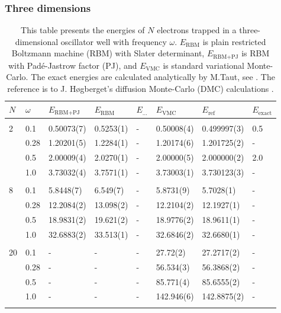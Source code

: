 \subsubsection{Three dimensions}
\begin{table} [H]
	\caption{This table presents the energies of $N$ electrons trapped in a three-dimensional oscillator well with frequency $\omega$. $E_{\text{RBM}}$ is plain restricted Boltzmann machine (RBM) with Slater determinant, $E_{\text{RBM+PJ}}$ is RBM with Padé-Jastrow factor (PJ), and $E_{\text{VMC}}$ is standard variational Monte-Carlo. The exact energies are calculated analytically by M.Taut, see \cite{taut_two_1993}. The reference is to J. Høgberget's diffusion Monte-Carlo (DMC) calculations \cite{hogberget_quantum_2013}. } 
	\begin{tabularx}{\textwidth}{l:l|XXXXXX} \hline\hline
		\label{tab:quantumdotswinteraction3D}
		$N$ & $\omega$ & $E_{\text{RBM+PJ}}$ & $E_{\text{RBM}}$ & $E_{\text{...}}$ & $E_{\text{VMC}}$ & $E_{\text{ref}} $ & $E_{\text{exact}}$ \\ \hline \\
		2 & 0.1 & 0.50073(7) & 0.5253(1) & - & 0.50008(4) & 0.499997(3) & 0.5 \\
		& 0.28 & 1.20201(5) & 1.2284(1) & - & 1.20174(6) & 1.201725(2) & - \\
		& 0.5 & 2.00009(4) & 2.0270(1) & - & 2.00000(5) & 2.000000(2) & 2.0 \\
		& 1.0 & 3.73032(4) & 3.7571(1) & - & 3.73003(1) & 3.730123(3) & - \\ \hdashline \\
		
		8 & 0.1 & 5.8448(7) & 6.549(7) & - & 5.8731(9) & 5.7028(1) & -\\ 
		& 0.28 & 12.2084(2) & 13.098(2) & - & 12.2104(2) & 12.1927(1) & -\\
		& 0.5 & 18.9831(2) & 19.621(2) & - & 18.9776(2) & 18.9611(1) & -\\
		& 1.0 & 32.6883(2) & 33.513(1) & - & 32.6846(2) & 32.6680(1) & -\\ \hdashline \\
		
		20 & 0.1 & - & - & - & 27.72(2) & 27.2717(2) & -\\ 
		& 0.28 & - & - & - & 56.534(3) & 56.3868(2) & -\\
		& 0.5 & - & - & - & 85.771(4) & 85.6555(2) & -\\
		& 1.0 & - & - & - & 142.946(6) & 142.8875(2) & -\\ \hdashline \\
		

\end{tabularx}
\end{table}
